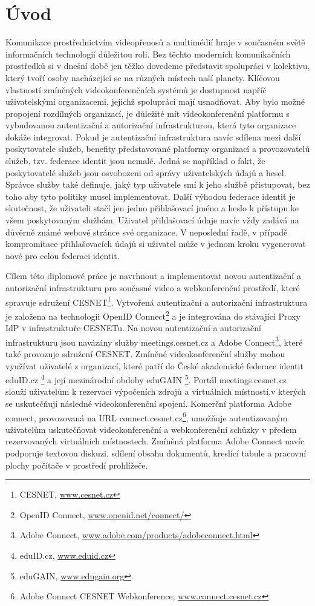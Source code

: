 \documentclass[
  printed, %
  twoside, %
  table,   %
  nolof,     %
  nolot,     %
]{fithesis3}
\begin{document}
\chapter{Úvod}
Komunikace prostřednictvím videopřenosů a multimédií hraje v současném světě informačních technologií důležitou roli. Bez těchto moderních komunikačních prostředků si v dnešní době jen těžko dovedeme představit spolupráci v kolektivu, který tvoří osoby nacházející se na různých místech naší planety. Klíčovou vlastností zmíněných videokonferenčních systémů je dostupnost napříč uživatelskými organizacemi, jejichž spolupráci mají usnadňovat. Aby bylo možné propojení rozdílných organizací, je důležité mít videokonferenční platformu s vybudovanou autentizační a autorizační infrastrukturou, která tyto organizace dokáže integrovat. Pokud je autentizační infrastruktura navíc sdílena mezi další poskytovatele služeb, benefity představované platformy organizací a provozovatelů služeb, tzv. federace identit jsou nemalé. Jedná se například o fakt, že poskytovatelé služeb jsou osvobozeni od správy uživatelských údajů a hesel. Správce služby také definuje, jaký typ uživatele smí k jeho službě přistupovat, bez toho aby tyto politiky musel implementovat. Další výhodou federace identit je skutečnost, že uživateli stačí jen jedno přihlašovací jméno a heslo k přístupu ke všem poskytovaným službám. Uživatel přihlašovací údaje navíc vždy zadává na důvěrně známé webové stránce své organizace. V neposlední řadě, v případě kompromitace  přihlašovacích údajů si uživatel může v jednom kroku vygenerovat nové pro celou federaci identit. 

Cílem této diplomové práce je navrhnout a implementovat novou autentizační a autorizační infrastrukturu pro současné video a webkonferenční prostředí, které spravuje sdružení CESNET\footnote{CESNET, \url{www.cesnet.cz}}. Vytvořená autentizační a autorizační infrastruktura je založena na technologii OpenID Connect\footnote{OpenID Connect, \url{www.openid.net/connect/}}  a je integrována do stávající Proxy IdP v infrastruktuře CESNETu. Na novou autentizační a autorizační infrastrukturu jsou navázány služby meetings.cesnet.cz \cite{shongoapi} a Adobe Connect\footnote{Adobe Connect, \url{www.adobe.com/products/adobeconnect.html}}, které také provozuje sdružení CESNET. Zmíněné videokonferenční služby mohou využívat uživatelé z organizací, které patří do České akademické federace identit eduID.cz \footnote{eduID.cz, \url{www.eduid.cz}} a její mezinárodní obdoby eduGAIN \footnote{eduGAIN, \url{www.edugain.org}}. Portál meetings.cesnet.cz slouží uživatelům k rezervaci výpočeních zdrojů a virtuálních místností,v kterých se uskutečňují následné videokonferenční spojení. Komerční platforma Adobe connect, provozovaná na URL connect.cesnet.cz\footnote{Adobe Connect CESNET Webkonference, \url{www.connect.cesnet.cz}}, umožňuje autentizovaným uživatelům uskutečňovat videokonferenční a webkonferenční schůzky v předem rezervovaných virtuálních místnostech. Zmíněná platforma Adobe Connect navíc podporuje textovou diskuzi, sdílení obsahu dokumentů, kreslící tabule a pracovní plochy počítače v prostředí prohlížeče. 
\end{document}
